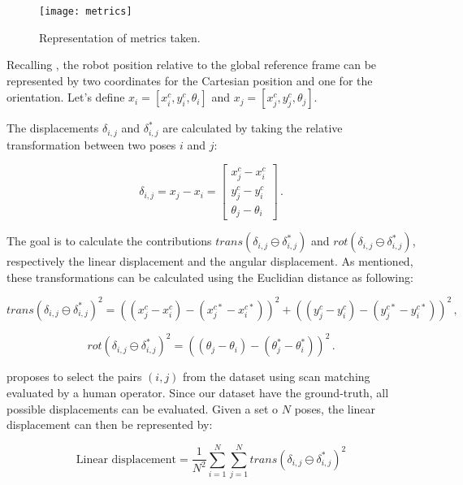 \begin{figure}[!ht]
    \centering
    \texttt{[image: metrics]}
    \caption{Representation of metrics taken.}
    \label{fig:metrics}
\end{figure}

Recalling , the robot position relative to the global reference frame can be represented by two coordinates for the Cartesian position and one for the orientation. Let's define $x_i = [x^c_i, y^c_i, \theta_i]$ and $x_j = [x^c_j, y^c_j, \theta_j]$.

The displacements $\delta_{i,j}$ and $\delta_{i,j}^*$ are calculated by taking the relative transformation between two poses $i$ and $j$:

\begin{equation}
\delta_{i,j} = x_j - x_i =
\begin{bmatrix}
x^c_j - x^c_i \\
y^c_j - y^c_i \\
\theta_j - \theta_i
\end{bmatrix} \,.
\end{equation}

The goal is to calculate the contributions $trans(\delta_{i,j} \ominus \delta_{i,j}^*)$ and $rot(\delta_{i,j} \ominus \delta_{i,j}^*)$, respectively the linear displacement and the angular displacement. As mentioned, these transformations can be calculated using the Euclidian distance as following:

\begin{equation}
trans(\delta_{i,j} \ominus \delta_{i,j}^*)^2 =
((x^c_j - x^c_i) - (x^{c*}_j - x^{c*}_i))^2 + 
((y^c_j - y^c_i) - (y^{c*}_j - y^{c*}_i))^2 \,,
\end{equation}

\begin{equation}
rot(\delta_{i,j} \ominus \delta_{i,j}^*)^2 = 
((\theta_j - \theta_i) - (\theta_j^* - \theta_i^*))^2 \,.
\end{equation}

\citeauthor{kummerle2009measuring} proposes to select the pairs $(i,j)$ from the dataset using scan matching evaluated by a human operator. Since our dataset have the ground-truth, all possible displacements can be evaluated. Given a set o $N$ poses, the linear displacement can then be represented by:

\begin{equation}
\text{Linear displacement} = \frac{1}{N^2} \sum_{i = 1}^N \sum_{j = 1}^N trans(\delta_{i,j} \ominus \delta_{i,j}^*)^2
\end{equation}

